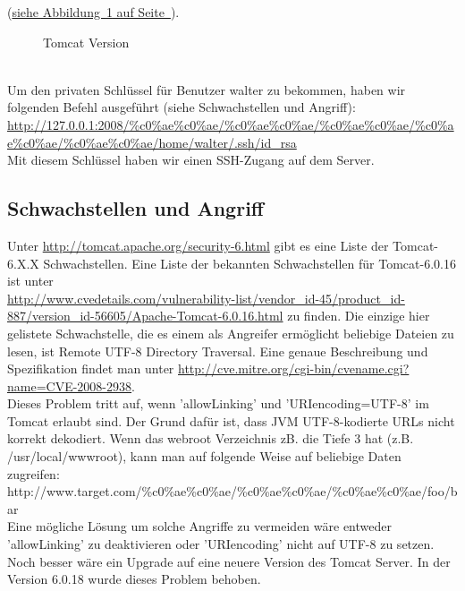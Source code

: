 \documentclass[12pt,a4paper,titlepage,oneside]{scrartcl}
\begin{document}
(\hyperref[fig:image2]{siehe Abbildung~\ref*{fig:image2} auf Seite~\pageref*{fig:image2}}).
\begin{figure}[h!]
  \centering
  \caption{Tomcat Version}
  \label{fig:image2}
\end{figure}
\\
Um den privaten Schlüssel für Benutzer walter zu bekommen, haben wir folgenden Befehl ausgeführt (siehe Schwachstellen und Angriff): \\\url{http://127.0.0.1:2008/\%c0\%ae\%c0\%ae/\%c0\%ae\%c0\%ae/\%c0\%ae\%c0\%ae/\%c0\%ae\%c0\%ae/\%c0\%ae\%c0\%ae/home/walter/.ssh/id_rsa}
\\Mit diesem Schlüssel haben wir einen SSH-Zugang auf dem Server.

\subsection{Schwachstellen und Angriff}
Unter \url{http://tomcat.apache.org/security-6.html} gibt es eine Liste der Tomcat-6.X.X Schwachstellen. Eine Liste der bekannten Schwachstellen für Tomcat-6.0.16 ist unter \\ \url{http://www.cvedetails.com/vulnerability-list/vendor_id-45/product_id-887/version_id-56605/Apache-Tomcat-6.0.16.html} zu finden. Die einzige hier gelistete Schwachstelle, die es einem als Angreifer ermöglicht beliebige Dateien zu lesen, ist Remote UTF-8 Directory Traversal. Eine genaue Beschreibung und Spezifikation findet man unter \url{http://cve.mitre.org/cgi-bin/cvename.cgi?name=CVE-2008-2938}. \\ 
Dieses Problem tritt auf, wenn 'allowLinking' und 'URIencoding=UTF-8' im Tomcat erlaubt sind. Der Grund dafür ist, dass JVM UTF-8-kodierte URLs nicht korrekt dekodiert. Wenn das webroot Verzeichnis zB. die Tiefe 3 hat (z.B. /usr/local/wwwroot), kann man auf folgende Weise auf beliebige Daten zugreifen: \\ http://www.target.com/\%c0\%ae\%c0\%ae/\%c0\%ae\%c0\%ae/\%c0\%ae\%c0\%ae/foo/bar   \\Eine mögliche Lösung um solche Angriffe zu vermeiden wäre entweder 'allowLinking' zu deaktivieren oder 'URIencoding' nicht auf UTF-8 zu setzen. Noch besser wäre ein Upgrade auf eine neuere Version des Tomcat Server. In der Version 6.0.18 wurde dieses Problem behoben. 
\end{document}
